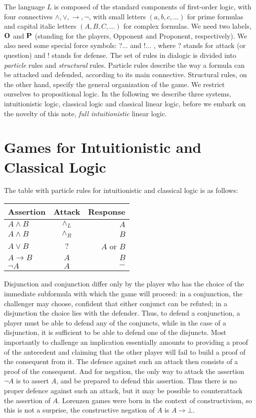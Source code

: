 \documentclass{article}
\begin{document}
The language $L$ is composed of the standard components of first-order logic, with four connectives 
$\land, \lor, \to, \neg$, with small letters $(a, b, c,\ldots)$ for prime formulas
and  capital italic letters $(A, B, C, \ldots)$ for complex formulas. We need two labels, $\bf O$ and $\bf P$ (standing for the players, Opponent and Proponent, respectively).
We also need some special force symbols: ?... and !... , where ? stands for attack (or question) and ! stands for defense. 
The set of rules in dialogic is divided into {\em particle} rules and {\em structural} rules. Particle rules describe the way a formula can be attacked and defended, according to its main connective. Structural rules, on the other hand, specify the general organization of the game. We restrict ourselves to propositional logic. 
In the following we describe three systems, intuitionistic logic, classical logic and classical linear logic, before we embark on the novelty of this note, {\em full intuitionistic} linear logic. 

\section*{Games for Intuitionistic and Classical Logic}
The table with particle rules for intuitionistic and classical logic is as follows:

\begin{center}
  \begin{tabular}{| l | c || r | }
    \hline
  Assertion & Attack  & Response \\ \hline
  $ A\land B$ & $\land_{L}$ & $A$ \\ \hline
   $ A\land B$ & $\land_{R}$ & $B$ \\ \hline
    $ A\lor B$ & $?$ & $A$ or $B$ \\ \hline
    $ A\to B$ & $A$ & $B$ \\ \hline
     $ \neg A$ & $A$ & $-$ \\ \hline
    \hline
  \end{tabular}
\end{center}
Disjunction and conjunction differ only by the player who has the choice of the immediate subformula with which the game will proceed: in a conjunction, the challenger may choose, confident that either conjunct can be refuted; in a disjunction the choice lies with the defender. Thus, to defend a conjunction, a player must be able to defend any of the conjuncts, while in the case of a disjunction, it is sufficient to be able to defend one of the disjuncts.  Most importantly to challenge an implication essentially amounts to providing a proof of the antecedent and claiming that the other player will fail to build a proof of the consequent from it. The defence against such an attack then consists of a proof of the consequent. And for negation, the only way to attack the assertion $\neg A$ is to assert $A$, and be prepared to defend this assertion. Thus there is no proper defence against such an attack, but it may be possible to counterattack the assertion of $A$. Lorenzen games were born in the context of constructivism, so this is not a surprise, the constructive negation of $A$ is $A\to \bot$.
\end{document}
